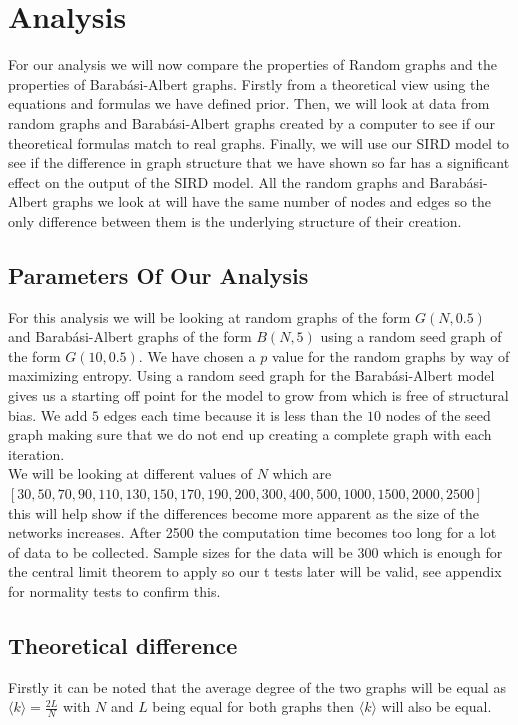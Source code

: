 \documentclass{article}
\begin{document}
        \section{Analysis}
            For our analysis we will now compare the properties of Random graphs and the properties of Barabási-Albert graphs. Firstly from a theoretical view using the equations and formulas we have defined prior. Then, we will look at data from random graphs and Barabási-Albert graphs created by a computer to see if our theoretical formulas match to real graphs. Finally, we will use our SIRD model to see if the difference in graph structure that we have shown so far has a significant effect on the output of the SIRD model. All the random graphs and Barabási-Albert graphs we look at will have the same number of nodes and edges so the only difference between them is the underlying structure of their creation.
            \subsection{Parameters Of Our Analysis}
            For this analysis we will be looking at random graphs of the form $G(N,0.5)$ and Barabási-Albert graphs of the form $B(N,5)$ using a random seed graph of the form $G(10,0.5)$. We have chosen a $p$ value for the random graphs by way of maximizing entropy. Using a random seed graph for the Barabási-Albert model gives us a starting off point for the model to grow from which is free of structural bias. We add $5$ edges each time because it is less than the $10$ nodes of the seed graph making sure that we do not end up creating a complete graph with each iteration.\\ 
            We will be looking at different values of $N$ which are\\ $ [30,50,70,90,110,130,150,170,190,200,300,400,500,1000,1500,2000,2500]$\\ this will help show if the differences become more apparent as the size of the networks increases. After 2500 the computation time becomes too long for a lot of data to be collected. Sample sizes for the data will be 300 which is enough for the central limit theorem to apply so our t tests later will be valid, see appendix for normality tests to confirm this.
            \subsection{Theoretical difference}
            Firstly it can be noted that the average degree of the two graphs will be equal as $\langle k \rangle = \frac{2L}{N}$ with $N$ and $L$ being equal for both graphs then $\langle k \rangle$ will also be equal.
\end{document}

